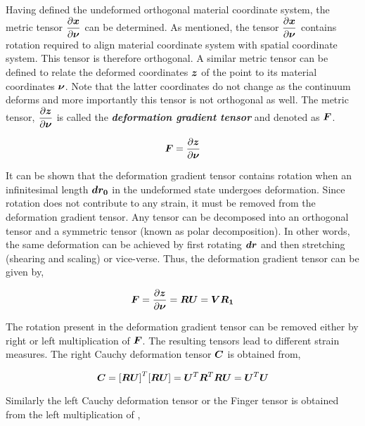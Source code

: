 Having defined the undeformed orthogonal material coordinate system, the
metric tensor $\delby{\vect{x}}{\vect{\nu}}$ can be determined. As mentioned,
the tensor $\delby{\vect{x}}{\vect{\nu}}$ contains rotation required to align
material coordinate system with spatial coordinate system. This tensor is
therefore orthogonal. A similar metric tensor can be defined to relate the
deformed coordinates $\vect{z}$ of the point to its material coordinates
$\vect{\nu}$. Note that the latter coordinates do not change as the continuum
deforms and more importantly this tensor is not orthogonal as well. The metric
tensor, $\delby{\vect{z}}{\vect{\nu}}$ is called the
\textit{\textbf{deformation gradient tensor}} and denoted as $\matr{F}$.

\begin{equation}
  \matr{F}=\delby{\vect{z}}{\vect{\nu}}
  \label{eqn:deformationgradienttensor}
\end{equation}
 
It can be shown that the deformation gradient tensor contains rotation when an
infinitesimal length $\vect{dr_{0}}$ in the undeformed state undergoes
deformation. Since rotation does not contribute to any strain, it must be
removed from the deformation gradient tensor. Any tensor can be decomposed
into an orthogonal tensor and a symmetric tensor (known as polar
decomposition). In other words, the same deformation can be achieved by first
rotating $\vect{dr}$ and then stretching (shearing and scaling) or
vice-verse. Thus, the deformation gradient tensor can be given by,

\begin{equation}
  \matr{F}=\delby{\vect{z}}{\vect{\nu}}=\matr{R}\matr{U}=\matr{V}\matr{R_{1}}
  \label{eqn:polardecomposition}
\end{equation}
 
The rotation present in the deformation gradient tensor can be removed either
by right or left multiplication of $\matr{F}$. The resulting tensors lead to
different strain measures. The right Cauchy deformation tensor $\matr{C}$ is
obtained from,

\begin{equation}
  \matr{C}=\transpose{[\matr{R}\matr{U}]}[\matr{R}\matr{U}]=\transpose{\matr{U}}\transpose{\matr{R}}\matr{R}\matr{U}=\transpose{\matr{U}}\matr{U}
  \label{eqn:rightcauchy}
\end{equation}

Similarly the left Cauchy deformation tensor or the Finger tensor  is
obtained from the left multiplication of ,

